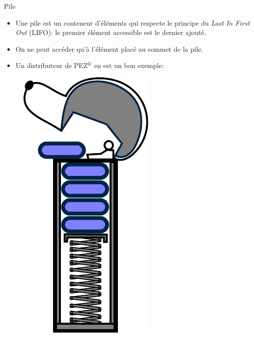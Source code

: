 \documentclass[12pt,a4paper]{beamer}
\begin{document}
\begin{frame}{Pile}{}
\begin{itemize}
\item Une pile est un conteneur d'éléments qui respecte le principe du \textcolor{blueemph}{\textit{Last In First Out}} (LIFO): le premier élément accessible est le dernier ajouté.
\item On ne peut accéder qu'à l'élément placé au sommet de la pile.
\item Un distributeur de PEZ$^{\mbox{\scriptsize{\textregistered}}}$ en est un bon exemple:
\end{itemize}
\begin{figure}
\includegraphics[scale=0.4]{figs/pez}
\end{figure}

\end{frame}
\end{document}

